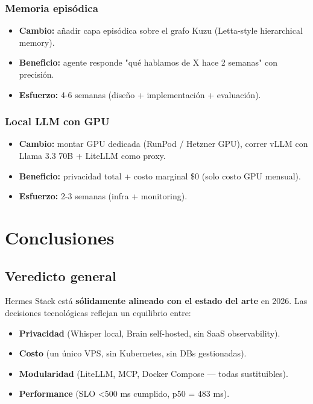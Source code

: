 \documentclass[11pt,a4paper]{article}
\begin{document}
\subsubsection{Memoria episódica}
\begin{itemize}[leftmargin=*,itemsep=1pt]
\item \textbf{Cambio:} añadir capa episódica sobre el grafo Kuzu (Letta-style hierarchical memory).
\item \textbf{Beneficio:} agente responde "qué hablamos de X hace 2 semanas" con precisión.
\item \textbf{Esfuerzo:} 4-6 semanas (diseño + implementación + evaluación).
\end{itemize}

\subsubsection{Local LLM con GPU}
\begin{itemize}[leftmargin=*,itemsep=1pt]
\item \textbf{Cambio:} montar GPU dedicada (RunPod / Hetzner GPU), correr vLLM con Llama 3.3 70B + LiteLLM como proxy.
\item \textbf{Beneficio:} privacidad total + costo marginal \$0 (solo costo GPU mensual).
\item \textbf{Esfuerzo:} 2-3 semanas (infra + monitoring).
\end{itemize}

\newpage

\section{Conclusiones}

\subsection{Veredicto general}

Hermes Stack está \textbf{sólidamente alineado con el estado del arte} en 2026. Las decisiones tecnológicas reflejan un equilibrio entre:

\begin{itemize}[leftmargin=*,itemsep=1pt]
\item \textbf{Privacidad} (Whisper local, Brain self-hosted, sin SaaS observability).
\item \textbf{Costo} (un único VPS, sin Kubernetes, sin DBs gestionadas).
\item \textbf{Modularidad} (LiteLLM, MCP, Docker Compose — todas sustituibles).
\item \textbf{Performance} (SLO \textless 500 ms cumplido, p50 = 483 ms).
\end{itemize}
\end{document}
